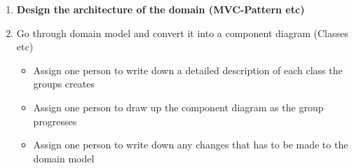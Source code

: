 \begin{enumerate}
    \item \textbf{Design the architecture of the domain (MVC-Pattern etc)}
    \item Go through domain model and convert it into a component diagram (Classes etc)
    \begin{itemize}
        \item Assign one person to write down a detailed description of each class the groups creates
        \item Assign one person to draw up the component diagram as the group progresses
        \item Assign one person to write down any changes that has to be made to the domain model
    \end{itemize}
\end{enumerate}
